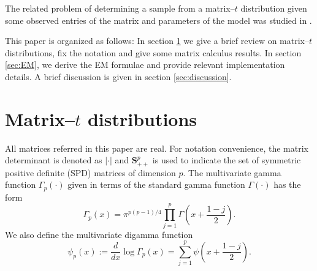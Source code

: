 \documentclass[english,listof=totoc]{scrartcl}
\begin{document}
The related problem of determining a sample from a matrix--$t$
distribution given some observed entries of the matrix and parameters
of the model was studied in \cite{NIPS2007_3203}.

This paper is organized as follows: In section \ref{sec:matrixt} we
give a brief review on matrix--$t$ distributions, fix the notation and
give some matrix calculus results. In section \ref{sec:EM}, we derive
the EM formulae and provide relevant implementation details.  A brief
discussion is given in section \ref{sec:discussion}.

\section{Matrix--$t$ distributions}\label{sec:matrixt}

All matrices referred in this paper are real. For notation convenience, the matrix determinant is denoted as $|\cdot|$ and $\mathbf{S}_{++}^p$ is used to indicate the set of symmetric positive definite (SPD) matrices of dimension $p$. The multivariate gamma function $\Gamma_{p}(\cdot)$ given in terms of the standard gamma function $\Gamma(\cdot)$ has the form
\begin{equation}
\Gamma_{p}(x)=\pi^{p(p-1)/4}\prod_{j=1}^{p}\Gamma\left(x+\frac{1-j}{2}\right).\label{eq:multgammadef}
\end{equation}
We also define the multivariate digamma function
%
\begin{equation}
\psi_{p}(x):=\frac{d}{dx}\log\Gamma_{p}(x)=\sum_{j=1}^{p}\psi\left(x+\frac{1-j}{2}\right).
\end{equation}
\end{document}
